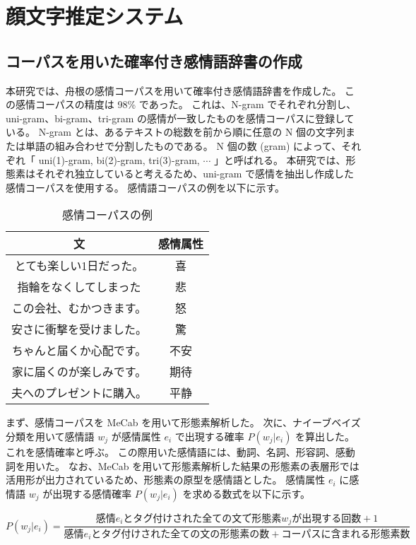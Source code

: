 \documentclass[11pt,a4j]{jsarticle}
\begin{document}
\section{顔文字推定システム}\label{sec:theorem}
  \subsection{コーパスを用いた確率付き感情語辞書の作成}\label{sec:tweetcorpus}
本研究では、舟根の感情コーパスを用いて確率付き感情語辞書を作成した。
この感情コーパスの精度は 98\% であった。
これは、N-gram でそれぞれ分割し、uni-gram、bi-gram、tri-gram の感情が一致したものを感情コーパスに登録している。
N-gram とは、あるテキストの総数を前から順に任意の N 個の文字列または単語の組み合わせで分割したものである。
N 個の数 (gram) によって、それぞれ「 uni(1)-gram, bi(2)-gram, tri(3)-gram, $\cdots$ 」と呼ばれる。
本研究では、形態素はそれぞれ独立していると考えるため、uni-gram で感情を抽出し作成した感情コーパスを使用する。
感情語コーパスの例を以下に示す。

\begin{table}[htb]
  \caption{感情コーパスの例}
  \centering
  \begin{tabular}{c|c} \hline
    文 & 感情属性 \\ \hline \hline
    とても楽しい1日だった。 & 喜 \\
    指輪をなくしてしまった & 悲 \\
    この会社、むかつきます。 & 怒 \\ 
    安さに衝撃を受けました。 & 驚 \\
    ちゃんと届くか心配です。 & 不安 \\
    家に届くのが楽しみです。 & 期待 \\
    夫へのプレゼントに購入。& 平静 \\ \hline
  \end{tabular}
\end{table}

まず、感情コーパスを MeCab を用いて形態素解析した。
次に、ナイーブベイズ分類を用いて感情語 $w_j$ が感情属性 $e_i$ で出現する確率 $P(w_j|e_i)$ を算出した。
これを感情確率と呼ぶ。
この際用いた感情語には、動詞、名詞、形容詞、感動詞を用いた。
なお、MeCab を用いて形態素解析した結果の形態素の表層形では活用形が出力されているため、形態素の原型を感情語とした。
感情属性 $e_i$ に感情語 $w_j$ が出現する感情確率 $P(w_j|e_i)$ を求める数式を以下に示す。

\[
P(w_j|e_i)=\frac{感情 e_i とタグ付けされた全ての文で形態素 w_j が出現する回数 +1}{感情 e_i とタグ付けされた全ての文の形態素の数 + コーパスに含まれる形態素数}
\]
\end{document}
